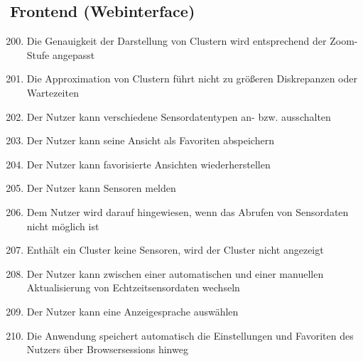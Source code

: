 \subsection{Frontend (Webinterface)}
\begin{enumerate}[label=\textbf{WK\arabic{enumi}0}]
	\setcounter{enumi}{199}
	\item Die Genauigkeit der Darstellung von Clustern wird entsprechend der Zoom-Stufe angepasst %
	\item Die Approximation von Clustern führt nicht zu größeren Diskrepanzen oder Wartezeiten
	\item Der Nutzer kann verschiedene Sensordatentypen an- bzw. ausschalten
	\item Der Nutzer kann seine Ansicht als Favoriten abspeichern
	\item Der Nutzer kann favorisierte Ansichten wiederherstellen
	\item Der Nutzer kann Sensoren melden
	\item Dem Nutzer wird darauf hingewiesen, wenn das Abrufen von Sensordaten nicht möglich ist
	\item Enthält ein Cluster keine Sensoren, wird der Cluster nicht angezeigt
	\item Der Nutzer kann zwischen einer automatischen und einer manuellen Aktualisierung von Echtzeitsensordaten wechseln
	\item Der Nutzer kann eine Anzeigesprache auswählen
	\item Die Anwendung speichert automatisch die Einstellungen und Favoriten des Nutzers über Browsersessions hinweg
\end{enumerate}

